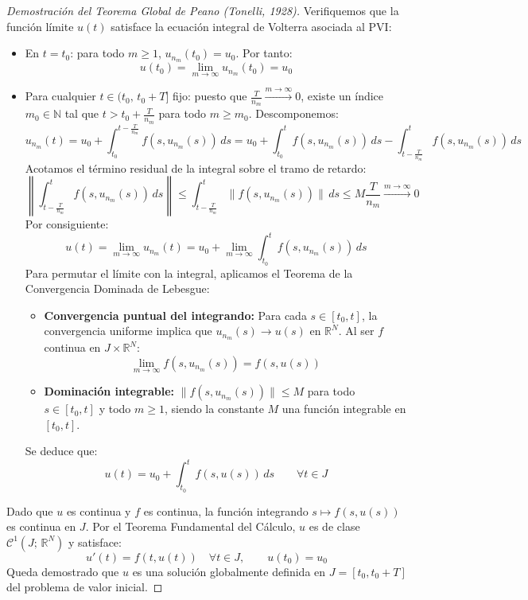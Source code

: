 \begin{proof}[Demostración del Teorema Global de Peano (Tonelli, 1928)]
    Verifiquemos que la función límite $u(t)$ satisface la ecuación integral de Volterra asociada al PVI:
    \begin{itemize}
        \item En $t = t_0$: para todo $m \geq 1$, $u_{n_m}(t_0) = u_0$. Por tanto:
        \[
            u(t_0) = \lim_{m \to \infty} u_{n_m}(t_0) = u_0
        \]
        \item Para cualquier $t \in (t_0, \, t_0 + T]$ fijo: puesto que $\frac{T}{n_m} \xrightarrow{m \to \infty} 0$, existe un índice $m_0 \in \mathbb{N}$ tal que $t > t_0 + \frac{T}{n_m}$ para todo $m \geq m_0$. Descomponemos:
        \[
            u_{n_m}(t) = u_0 + \int_{t_0}^{t - \frac{T}{n_m}} f(s, u_{n_m}(s)) \, ds = u_0 + \int_{t_0}^t f(s, u_{n_m}(s)) \, ds - \int_{t - \frac{T}{n_m}}^t f(s, u_{n_m}(s)) \, ds
        \]
        Acotamos el término residual de la integral sobre el tramo de retardo:
        \[
            \left\| \int_{t - \frac{T}{n_m}}^t f(s, u_{n_m}(s)) \, ds \right\| \leq \int_{t - \frac{T}{n_m}}^t \|f(s, u_{n_m}(s))\| \, ds \leq M \frac{T}{n_m} \xrightarrow{m \to \infty} 0
        \]
        Por consiguiente:
        \[
            u(t) = \lim_{m \to \infty} u_{n_m}(t) = u_0 + \lim_{m \to \infty} \int_{t_0}^t f(s, u_{n_m}(s)) \, ds
        \]
        Para permutar el límite con la integral, aplicamos el Teorema de la Convergencia Dominada de Lebesgue:
        \begin{itemize}
            \item \textbf{Convergencia puntual del integrando:} Para cada $s \in [t_0, t]$, la convergencia uniforme implica que $u_{n_m}(s) \to u(s)$ en $\mathbb{R}^N$. Al ser $f$ continua en $J \times \mathbb{R}^N$:
            \[
                \lim_{m \to \infty} f(s, u_{n_m}(s)) = f(s, u(s))
            \]
            \item \textbf{Dominación integrable:} $\|f(s, u_{n_m}(s))\| \leq M$ para todo $s \in [t_0, t]$ y todo $m \geq 1$, siendo la constante $M$ una función integrable en $[t_0, t]$.
        \end{itemize}
        Se deduce que:
        \[
            u(t) = u_0 + \int_{t_0}^t f(s, u(s)) \, ds \qquad \forall t \in J
        \]
    \end{itemize}

    Dado que $u$ es continua y $f$ es continua, la función integrando $s \mapsto f(s, u(s))$ es continua en $J$. Por el Teorema Fundamental del Cálculo, $u$ es de clase $\mathcal{C}^1(J; \, \mathbb{R}^N)$ y satisface:
    \[
        u'(t) = f(t, u(t)) \quad \forall t \in J, \qquad u(t_0) = u_0
    \]
    Queda demostrado que $u$ es una solución globalmente definida en $J = [t_0, t_0 + T]$ del problema de valor inicial.
\end{proof}

